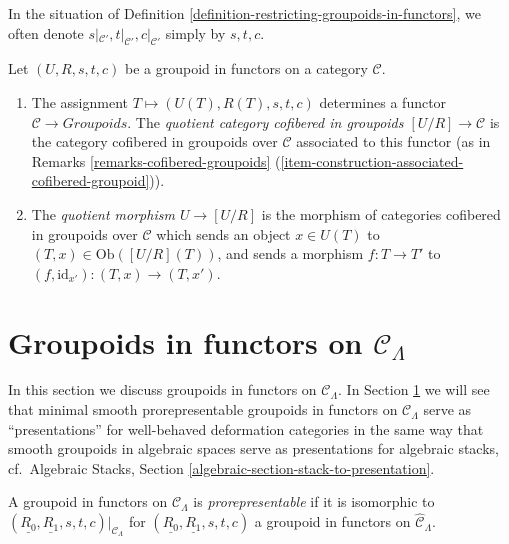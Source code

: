 \begin{remark}
\label{remark-notation-restriction}
In the situation of Definition 
\ref{definition-restricting-groupoids-in-functors}, we often denote 
$s|_{\mathcal{C}'},t|_{\mathcal{C}'},c|_{\mathcal{C}'}$ simply by $s,t,c$.
\end{remark}

\begin{definition}
\label{definition-quotient}
Let $(U,R,s,t,c)$ be a groupoid in functors on a category $\mathcal{C}$. 
\begin{enumerate}
\item The assignment $T \mapsto  (U(T), R(T), s,t,c)$ determines a functor 
$\mathcal{C} \to \textit{Groupoids}$. The {\it quotient category 
cofibered in groupoids $[U/R] \to \mathcal{C}$} is the category 
cofibered in groupoids over $\mathcal{C}$ associated to this functor (as in 
Remarks \ref{remarks-cofibered-groupoids} 
(\ref{item-construction-associated-cofibered-groupoid})).  
\item The {\it quotient morphism $U \to [U/R]$} is the morphism of 
categories cofibered in groupoids over $\mathcal{C}$ which sends an object $x 
\in U(T)$ to $(T,x) \in \text{Ob}([U/R](T))$, and sends a morphism $f: T 
\to T'$ to $(f, \text{id}_{x'}): (T,x) \to (T,x')$.
\end{enumerate} 
\end{definition}





\section{Groupoids in functors on $\mathcal{C}_\Lambda$}
\label{section-prerepresentable-groupoids-in-functors}

\noindent
In this section we discuss groupoids in functors on $\mathcal{C}_\Lambda$.
In Section \ref{section-prerepresentable-groupoids-in-functors}
we will see that minimal smooth prorepresentable groupoids
in functors on $\mathcal{C}_\Lambda$ serve as ``presentations''
for well-behaved deformation categories in the same way that 
smooth groupoids in algebraic spaces serve as presentations for
algebraic stacks,
cf.\ Algebraic Stacks, Section \ref{algebraic-section-stack-to-presentation}.

\begin{definition}
\label{definition-prorepresentable-groupoid-in-functors}
A groupoid in functors on $\mathcal{C}_\Lambda$ is {\it prorepresentable} if 
it is isomorphic to $(\underline{R_0}, \underline{R_1}, s,t,c)|_{\mathcal 
C_\Lambda}$ for $(\underline{R_0}, \underline{R_1}, s,t,c)$ a groupoid in 
functors on $\widehat{\mathcal{C}}_\Lambda$.
\end{definition}

